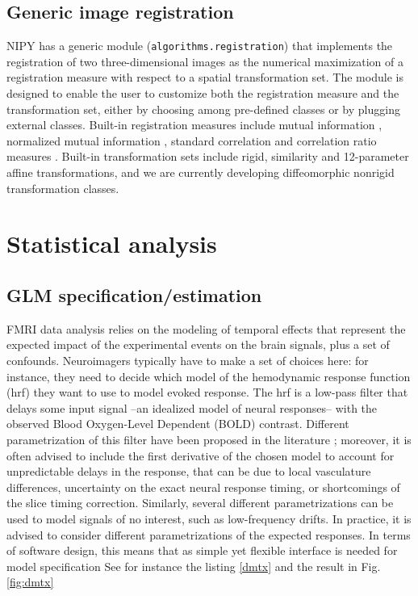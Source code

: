 \documentclass{bioinfo}
\begin{document}
\subsection{Generic image registration}

NIPY has a generic module ({\tt algorithms.registration}) that
implements the registration of two three-dimensional images as the
numerical maximization of a registration measure with respect to a
spatial transformation set. The module is designed to enable the user
to customize both the registration measure and the transformation set,
either by choosing among pre-defined classes or by plugging external
classes. Built-in registration measures include mutual information
\citep{maes:tmi:97}, normalized mutual information
\citep{studholme:pr:98}, standard correlation and correlation ratio
measures \citep{roche:ijist:00}. Built-in transformation sets include
rigid, similarity and 12-parameter affine transformations, and we are
currently developing diffeomorphic nonrigid transformation classes.





\section{Statistical analysis}

\subsection{GLM specification/estimation}

FMRI data analysis relies on the modeling of temporal effects that
represent the expected impact of the experimental events on the brain
signals, plus a set of confounds.
%
Neuroimagers typically have to make a set of choices here: for
instance, they need to decide which model of the hemodynamic response
function (hrf) they want to use to model evoked response. 
%
The hrf is a low-pass filter that delays some input signal --an
idealized model of neural responses-- with the observed Blood
Oxygen-Level Dependent (BOLD) contrast.
%
Different parametrization of this filter have been proposed in the
literature \cite{Friston1998,Glover1999}; moreover, it is often
advised to include the first derivative of the chosen model to account
for unpredictable delays in the response, that can be due to local
vasculature differences, uncertainty on the exact neural response
timing, or shortcomings of the slice timing correction.
%
Similarly, several different parametrizations can be used to model
signals of no interest, such as low-frequency drifts.
%
In practice, it is advised to consider different parametrizations of
the expected responses.
% 
In terms of software design, this means that as simple yet flexible
interface is needed for model specification
See for instance the listing \ref{dmtx} and the result in
Fig. \ref{fig:dmtx}
\end{document}
